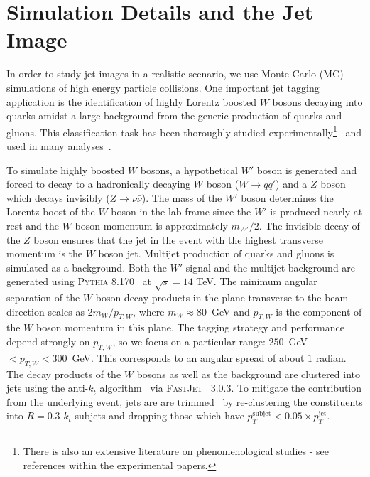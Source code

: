 \section{Simulation Details and the Jet Image}
\label{sec:simulation}

In order to study jet images in a realistic scenario, we use Monte Carlo (MC) simulations of high energy particle collisions. One important jet tagging application is the identification of highly Lorentz boosted $W$ bosons decaying into quarks amidst a large background from the generic production of quarks and gluons.  This classification task has been thoroughly studied experimentally\footnote{There is also an extensive literature on phenomenological studies - see references within the experimental papers.}~\cite{Khachatryan:2014vla,ATL-PHYS-PUB-2015-033,ATL-PHYS-PUB-2014-004} and used in many analyses~\cite{Aad:2015owa,Khachatryan:2014hpa,Khachatryan:2015mta,Khachatryan:2015oba,Khachatryan:2015gza,Khachatryan:2015bma,Khachatryan:2015cwa,Khachatryan:2015ywa,Aad:2014wea,Aad:2015agg,Aad:2015kna,Aad:2015ufa,Aad:2014haa}.  

To simulate highly boosted $W$ bosons, a hypothetical $W'$ boson is generated and forced to decay to a hadronically decaying $W$ boson ($W\rightarrow qq'$) and a $Z$ boson which decays invisibly ($Z\rightarrow \nu\bar{\nu}$).  The mass of the $W'$ boson determines the Lorentz boost of the $W$ boson in the lab frame since the $W'$ is produced nearly at rest and the $W$ boson momentum is approximately $m_{W'}/2$.  The invisible decay of the $Z$ boson ensures that the jet in the event with the highest transverse momentum is the $W$ boson jet.  Multijet production of quarks and gluons is simulated as a background.  Both the $W'$ signal and the multijet background are generated using \textsc{Pythia} 8.170~\cite{Pythia8,Pythia} at $\sqrt{s}=14$ TeV.  The minimum angular separation of the $W$ boson decay products in the plane transverse to the beam direction scales as $2m_{W}/p_{T,W}$, where $m_W\approx 80$~GeV and $p_{T,W}$ is the component of the $W$ boson momentum in this plane.  The tagging strategy and performance depend strongly on $p_{T,W}$, so we focus on a particular range: $250$~GeV~$<p_{T,W}<300$~GeV.  This corresponds to an angular spread of about $1$ radian.  The decay products of the $W$ bosons as well as the background are clustered into jets using the anti-$k_t$ algorithm~\cite{antiktpaper} via \textsc{FastJet}~\cite{fastjet} 3.0.3.  To mitigate the contribution from the underlying event, jets are are trimmed~\cite{trimming} by re-clustering the constituents into $R=0.3$ $k_t$ subjets and dropping those which have $p_T^\text{subjet}<0.05\times p_T^\text{jet}$. 

